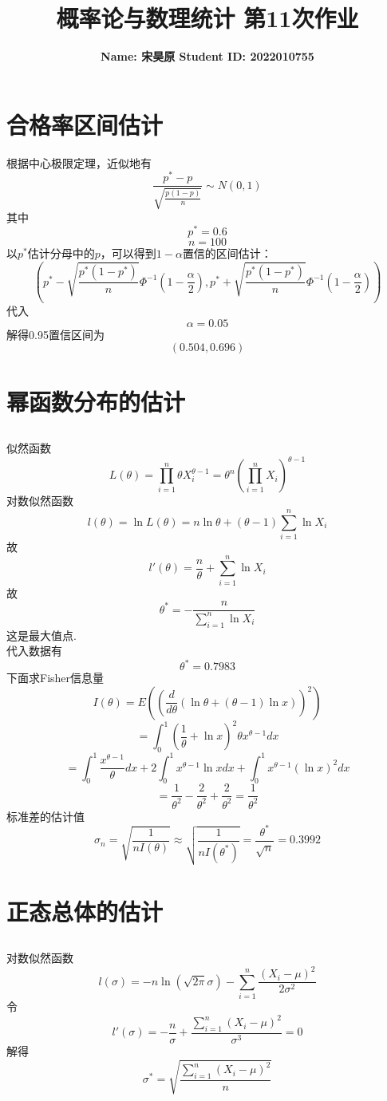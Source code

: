 \documentclass{article}
\title{\bf\Large  概率论与数理统计 第11次作业}
\author{\bf Name: 宋昊原 \qquad Student ID: 2022010755}
\begin{document}
\begin{CJK}{UTF8}{gbsn}
\maketitle
\section{合格率区间估计}
根据中心极限定理，近似地有
$$ \frac{p^{*}-p}{\sqrt{\frac{p(1-p)}{n}}}\sim N(0,1)$$
其中
$$ p^{*}=0.6$$
$$ n=100$$
以$p^{*}$估计分母中的$p$，可以得到$1-\alpha$置信的区间估计：
$$(p^{*}-\sqrt{\frac{p^{*}(1-p^{*})}{n}}\Phi^{-1}(1-\frac{\alpha}{2}),p^{*}+\sqrt{\frac{p^{*}(1-p^{*})}{n}}\Phi^{-1}(1-\frac{\alpha}{2}))$$
代入
$$\alpha = 0.05$$
解得0.95置信区间为
$$ (0.504,0.696)$$
\section{幂函数分布的估计}
\subsection{}
似然函数
$$ L(\theta)=\prod\limits_{i=1}^{n}\theta X_{i}^{\theta-1}=\theta^{n}(\prod\limits_{i=1}^{n}X_{i})^{\theta-1}$$
对数似然函数
$$ l(\theta)=\ln L(\theta)=n\ln\theta+(\theta-1)\sum\limits_{i=1}^{n}\ln X_{i}$$
故
$$ l'(\theta)=\frac{n}{\theta}+\sum\limits_{i=1}^{n}\ln X_{i}$$
故
$$ \theta^{*}=-\frac{n}{\sum\limits_{i=1}^{n}\ln X_{i}}$$
这是最大值点.
\\代入数据有
$$ \theta^{*}=0.7983$$
下面求Fisher信息量
$$ I(\theta)=E((\frac{d}{d\theta}(\ln\theta+(\theta-1)\ln x))^{2})$$
$$ =\int_{0}^{1}(\frac{1}{\theta}+\ln x)^{2}\theta x^{\theta-1}dx$$
$$ =\int_{0}^{1}\frac{x^{\theta-1}}{\theta}dx+2\int_{0}^{1}x^{\theta-1}\ln xdx+\int_{0}^{1}x^{\theta-1}(\ln x)^{2}dx$$
$$ =\frac{1}{\theta^{2}}-\frac{2}{\theta^{2}}+\frac{2}{\theta^{2}}=\frac{1}{\theta^{2}}$$
标准差的估计值
$$ \sigma_{n}=\sqrt{\frac{1}{nI(\theta)}}\approx\sqrt{\frac{1}{nI(\theta^{*})}}=\frac{\theta^{*}}{\sqrt{n}}=0.3992$$
\section{正态总体的估计}
\subsection{}
对数似然函数
$$ l(\sigma)=-n\ln(\sqrt{2\pi}\sigma)-\sum\limits_{i=1}^{n}\frac{(X_{i}-\mu)^{2}}{2\sigma^{2}} $$
令
$$ l'(\sigma)=-\frac{n}{\sigma}+\frac{\sum\limits_{i=1}^{n}(X_{i}-\mu)^{2}}{\sigma^{3}}=0$$
解得
$$ \sigma^{*}=\sqrt{\frac{\sum\limits_{i=1}^{n}(X_{i}-\mu)^{2}}{n}}$$

\end{CJK}
\end{document}
